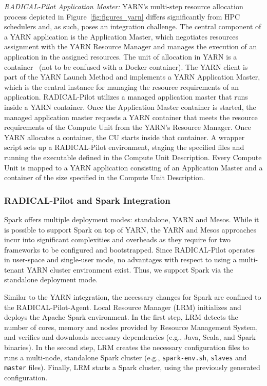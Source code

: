 \emph{RADICAL-Pilot Application Master:} YARN's multi-step resource allocation
process depicted in Figure~\ref{fig:figures_yarn} differs significantly from HPC
schedulers and, as such, poses an integration challenge. The central component
of a YARN application is the Application Master, which negotiates resources
assignment with the YARN Resource Manager and manages the execution of an
application in the assigned resources. The unit of allocation in YARN is a
container~\cite{murthy2014apache} (not to be confused with a Docker container).
The YARN client is part of the YARN Launch Method and implements a YARN
Application Master, which is the central instance for managing the resource
requirements of an application. RADICAL-Pilot utilizes a managed application
master that runs inside a YARN container. Once the Application Master container
is started, the managed application master requests a YARN container that meets
the resource requirements of the Compute Unit from the YARN's Resource Manager.
Once YARN allocates a container, the CU starts inside that container. A wrapper
script sets up a RADICAL-Pilot environment, staging the specified files and
running the executable defined in the Compute Unit Description. Every Compute
Unit is mapped to a YARN application consisting of an Application Master and a
container of the size specified in the Compute Unit Description.

\subsubsection*{RADICAL-Pilot and Spark Integration}
\label{sssec:rp_spark}

Spark offers multiple deployment modes: standalone, YARN and Mesos. While it is
possible to support Spark on top of YARN, the YARN and Mesos approaches incur
into significant complexities and overheads as they require for two frameworks
to be configured and bootstrapped. Since RADICAL-Pilot operates in user-space
and single-user mode, no advantages with respect to using a multi-tenant YARN
cluster environment exist. Thus, we support Spark via the standalone deployment
mode.

Similar to the YARN integration, the necessary changes for Spark are confined to
the RADICAL-Pilot-Agent. Local Resource Manager (LRM) initializes and deploys
the Apache Spark environment. In the first step, LRM detects the number of
cores, memory and nodes provided by Resource Management System, and verifies and
downloads necessary dependencies (e.g., Java, Scala, and Spark binaries). In the
second step, LRM creates the necessary configuration files to runs a multi-node,
standalone Spark cluster (e.g., \texttt{spark-env.sh}, \texttt{slaves} and
\texttt{master} files). Finally, LRM starts a Spark cluster, using the
previously generated configuration.

